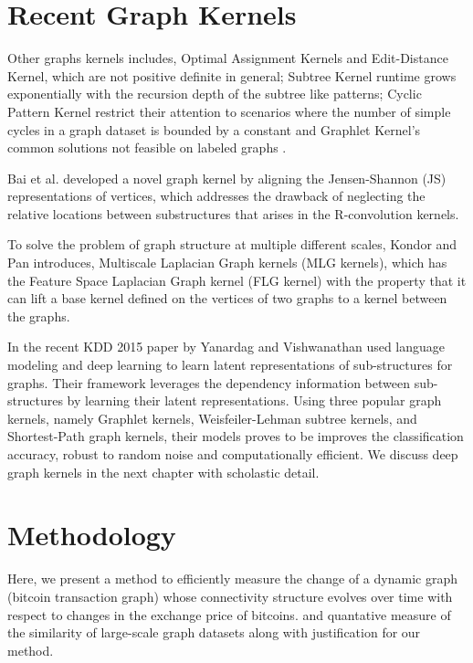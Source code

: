 \section{Recent Graph Kernels}

Other graphs kernels includes,  Optimal Assignment Kernels and Edit-Distance Kernel, which  are not positive definite in general; Subtree Kernel runtime grows exponentially with the recursion depth of the subtree like patterns; Cyclic Pattern Kernel restrict their attention to scenarios where the number of simple cycles in a graph dataset is bounded by a constant and Graphlet Kernel's common solutions not feasible on labeled graphs \citep{Vishwanathan2010}.  

Bai et al.\citep{Bai2015} developed a novel graph kernel by aligning the Jensen-Shannon (JS) representations of vertices, which addresses the drawback of neglecting the relative locations between substructures that arises in the R-convolution kernels. 

To solve the problem of graph structure at multiple different scales, Kondor and Pan \citep{Kondor2016} introduces, Multiscale Laplacian Graph kernels (MLG kernels), which has the Feature Space Laplacian Graph kernel (FLG kernel) with the  property that it can lift a base kernel
defined on the vertices of two graphs to a kernel between the graphs. 

In the recent KDD 2015 paper by Yanardag and Vishwanathan \citep{Yanardag2015} used language modeling and deep learning to learn latent representations of sub-structures for graphs. Their framework leverages the dependency information between sub-structures by learning their latent representations. Using three popular graph kernels, namely Graphlet kernels, Weisfeiler-Lehman subtree kernels, and Shortest-Path graph kernels, their models proves to be improves the classification accuracy, robust to random noise and computationally efficient. We discuss deep graph kernels in the next chapter with scholastic detail.

\section{Methodology}

Here, we present a method to efficiently measure the change
of a dynamic graph (bitcoin transaction graph) whose connectivity structure evolves over time with respect to changes in the exchange price of bitcoins. and quantative measure of the similarity of large-scale graph datasets along with justification for our method.

